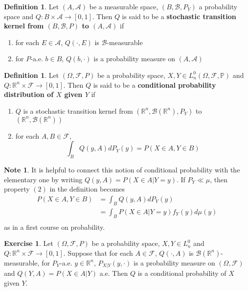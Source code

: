 \documentclass[12pt]{amsart}
\theoremstyle{definition}
\newtheorem{defn}[definition]{Definition}
\newtheorem{note}[definition]{Note}
\newtheorem{ex}[definition]{Exercise}
\newcommand{\Om}{\Omega}
\newcommand{\R}{\mathbb{R}}
\renewcommand{\P}{\mathbb{P}}
\newcommand{\MA}{\mathcal{A}}
\newcommand{\MB}{\mathcal{B}}
\newcommand{\MF}{\mathcal{F}}
\begin{document}
	\begin{defn}
	Let $(A, \MA)$ be a measurable space, $(B, \MB, P_Y)$ a probability space and $Q:B \times \MA \rightarrow [0,1]$. Then $Q$ is said to be a \textbf{stochastic transition kernel from $(B, \MB, P)$ to $(A, \MA)$} if 
	\begin{enumerate}
	\item for each $E \in \MA$, $Q(\cdot, E)$ is $\MB$-measurable
	\item for $P$-a.e. $b \in B$, $Q(b, \cdot)$ is a probability measure on $(A, \MA)$
	\end{enumerate}
	\end{defn}	
	
	\begin{defn}
	Let $(\Om, \MF, P)$ be a probability space, $X,Y \in L_n^0(\Om, \MF, \P)$ and $Q: \R^n  \times \MF \rightarrow [0,1]$. Then $Q$ is said to be a \textbf{conditional probability distribution of $X$ given $Y$} if 
	\begin{enumerate}
	\item $Q$ is a stochastic transition kernel from $(\R^n, \MB(\R^n), P_Y)$ to $(\R^n, \MB(\R^n))$
	\item for each $A,B \in \MF$, $$\int_B Q(y, A) dP_Y(y) = P(X \in A, Y \in B)$$ 
	\end{enumerate}
	\end{defn}
	
	\begin{note}
	It is helpful to connect this notion of conditional probability with the elementary one by writing $Q(y, A) = P(X \in A| Y = y)$. If $P_Y \ll \mu$, then property $(2)$ in the definition becomes 
	\begin{align*}
	P(X \in A, Y \in B)  
	&=  \int_B Q(y, A) dP_Y(y) \\
	&= \int_B P(X \in A|Y=y) f_Y(y)d \mu(y) \\
\end{align*}	 
	as in a first course on probability.
	\end{note}	
	
	\begin{ex}
	Let $(\Om, \MF, P)$ be a probability space, $X,Y \in L_n^0$ and $Q: \R^n \times \MF \rightarrow [0,1]$. Suppose that for each $A \in \MF$, $Q(\cdot, A)$ is $\MB(\R^n)$-measurable, for $P_Y$-a.e. $y \in \R^n$, $P_{X|Y}(y, \cdot)$ is a probability measure on $(\Om, \MF)$ and $Q(Y, A) = P(X \in A|Y)$ a.e. Then $Q$ is a conditional probability of $X$ given $Y$.
	\end{ex}	
	
\end{document}
